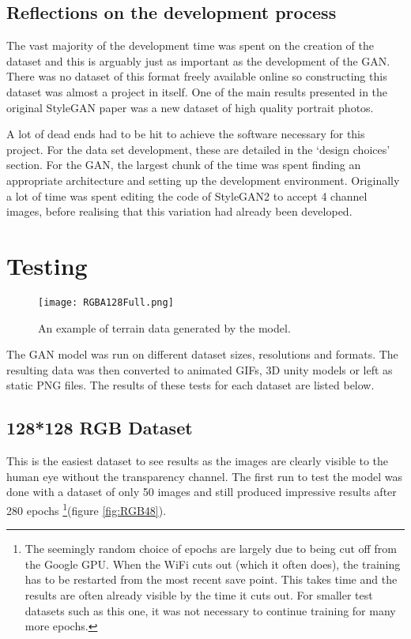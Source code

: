 \documentclass[a4paper]{report}
\begin{document}
\subsection{Reflections on the development process}
The vast majority of the development time was spent on the creation of the dataset and this is arguably just as important as the development of the GAN. There was no dataset of this format freely available online so constructing this dataset was almost a project in itself. One of the main results presented in the original StyleGAN paper \cite{stylegan} was a new dataset of high quality portrait photos.

A lot of dead ends had to be hit to achieve the software necessary for this project. For the data set development, these are detailed in the `design choices' section. For the GAN, the largest chunk of the time was spent finding an appropriate architecture and setting up the development environment. Originally a lot of time was spent editing the code of StyleGAN2 to accept 4 channel images, before realising that this variation had already been developed.

\section{Testing}
\begin{figure}[H]
    \centering
        \texttt{[image: RGBA128Full.png]}
        \caption{An example of terrain data generated by the model.}
        \label{fig:ToDo}
\end{figure}

The GAN model was run on different dataset sizes, resolutions and formats. The resulting data was then converted to animated GIFs, 3D unity models or left as static PNG files. The results of these tests for each dataset are listed below.

\subsection{128*128 RGB Dataset}

This is the easiest dataset to see results as the images are clearly visible to the human eye without the transparency channel. The first run to test the model was done with a dataset of only 50 images and still produced impressive results after 280 epochs \footnote{The seemingly random choice of epochs are largely due to being cut off from the Google GPU. When the WiFi cuts out (which it often does), the training has to be restarted from the most recent save point. This takes time and the results are often already visible by the time it cuts out. For smaller test datasets such as this one, it was not necessary to continue training for many more epochs.}(figure \ref{fig:RGB48}).
\end{document}
